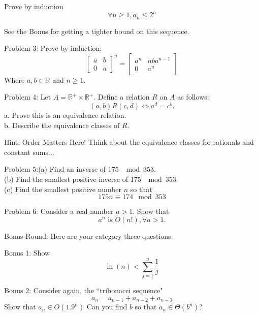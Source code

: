 \documentclass[16 pt]{amsart}
\theoremstyle{definition}
\theoremstyle{remark}
\numberwithin{equation}{subsection}
\newcommand{\R}{\mathbb{R}}
\begin{document}
Prove by induction 
\[
\forall n\ge 1, a_n \le 2^n
\]
\vspace{.5in}

See the Bonus for getting a tighter bound on this sequence.

\newpage

Problem 3: Prove by induction:
\[
\begin{bmatrix}
a & b \\
0 & a
\end{bmatrix}^n = 
\begin{bmatrix}
a^n & nba^{n-1} \\
0 & a^n
\end{bmatrix}
\]
Where $a,b\in \R$ and $n\ge 1$.

\newpage

Problem 4: Let $A= \R^+ \times \R^+$.  Define a relation $R$ on $A$ as follows:
\[
(a,b) R (c,d) \iff a^d = c^b.
\]
a. Prove this is an equivalence relation.\\
b. Describe the equivalence classes of $R$.

\vspace{.5in}

Hint: Order Matters Here! Think about the equivalence classes for rationals and constant sums...

\newpage

Problem 5:(a) Find an inverse of 175 $\mod{353}$.\\

(b) Find the smallest positive inverse of 175 $\mod{353}$\\

(c) Find the smallest positive number $n$ so that
\[
175 n \equiv 174 \mod{353}
\]

\newpage

Problem 6: Consider a real number $a>1$.  Show that
\[
a^n \text{ is } O(n!), \forall a>1.
\]
 
\newpage

Bonus Round:  Here are your category three questions:

Bonus 1: Show 
\[
\ln(n) < \sum_{j=1}^{n} \frac{1}{j}
\]

\vspace{.75in}

Bonus 2: Consider again, the ``tribonacci sequence"
\[
a_n = a_{n-1}+a_{n-2}+a_{n-3}
\]
Show that $a_n \in O(1.9^n)$ Can you find $b$ so that $a_n \in \Theta(b^n)$?

\vspace{.75in}
\end{document}
